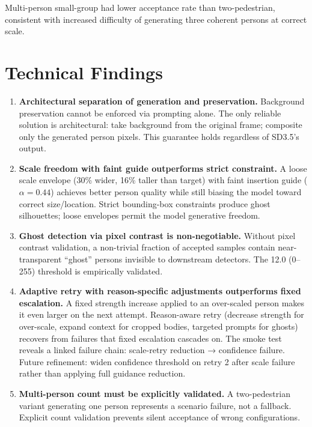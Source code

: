 \documentclass[12pt,a4paper]{article}
\begin{document}
Multi-person small-group had lower acceptance rate than two-pedestrian, consistent with increased difficulty of generating three coherent persons at correct scale.

\section{Technical Findings}

\begin{enumerate}

    \item \textbf{Architectural separation of generation and preservation.} Background preservation cannot be enforced via prompting alone. The only reliable solution is architectural: take background from the original frame; composite only the generated person pixels. This guarantee holds regardless of SD3.5's output.

    \item \textbf{Scale freedom with faint guide outperforms strict constraint.} A loose scale envelope (30\% wider, 16\% taller than target) with faint insertion guide ($\alpha=0.44$) achieves better person quality while still biasing the model toward correct size/location. Strict bounding-box constraints produce ghost silhouettes; loose envelopes permit the model generative freedom.

    \item \textbf{Ghost detection via pixel contrast is non-negotiable.} Without pixel contrast validation, a non-trivial fraction of accepted samples contain near-transparent ``ghost'' persons invisible to downstream detectors. The 12.0 (0--255) threshold is empirically validated.

    \item \textbf{Adaptive retry with reason-specific adjustments outperforms fixed escalation.} A fixed strength increase applied to an over-scaled person makes it even larger on the next attempt. Reason-aware retry (decrease strength for over-scale, expand context for cropped bodies, targeted prompts for ghosts) recovers from failures that fixed escalation cascades on. The smoke test reveals a linked failure chain: scale-retry reduction → confidence failure. Future refinement: widen confidence threshold on retry 2 after scale failure rather than applying full guidance reduction.

    \item \textbf{Multi-person count must be explicitly validated.} A two-pedestrian variant generating one person represents a scenario failure, not a fallback. Explicit count validation prevents silent acceptance of wrong configurations.

\end{enumerate}
\end{document}

